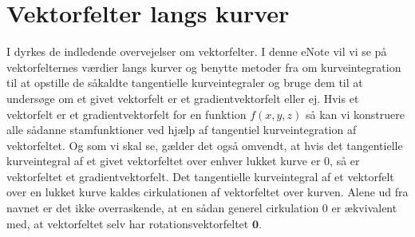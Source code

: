 

\setcounter{chapter}{24} %


%
%
%
%
%
%


\chapter{Vektorfelter langs kurver} \label{tn25}


\begin{basis}
I  dyrkes de indledende overvejelser om vektorfelter. I denne eNote vil vi se på vektorfelternes værdier langs kurver og benytte metoder fra   om kurveintegration til at opstille de såkaldte tangentielle kurveintegraler og bruge dem til at undersøge om et givet vektorfelt er et gradientvektorfelt eller ej. Hvis et vektorfelt er et gradientvektorfelt for en funktion $f(x,y,z)$ så kan vi konstruere alle sådanne stamfunktioner ved hjælp af tangentiel kurveintegration af vektorfeltet. Og som vi skal se, gælder det også omvendt, at hvis det tangentielle kurveintegral af et givet vektorfeltet over enhver lukket kurve er $0$, så er vektorfeltet et gradientvektorfelt. Det tangentielle kurveintegral af et vektorfelt over en lukket kurve kaldes cirkulationen af vektorfeltet over kurven. Alene ud fra navnet er det ikke overraskende, at en sådan generel cirkulation $0$ er ækvivalent med, at vektorfeltet selv har rotationsvektorfeltet $\mathbf{0}$.
\end{basis}




